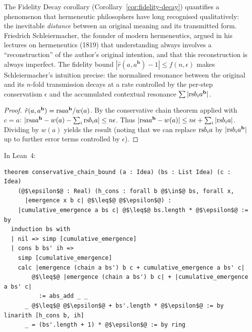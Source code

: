 \begin{remark}
\label{rem:ch9:fidelity_decay_hermeneutics}
The Fidelity Decay corollary (Corollary~\ref{cor:fidelity-decay}) quantifies
a phenomenon that hermeneutic philosophers have long recognised qualitatively:
the inevitable \emph{distance} between an original meaning and its
transmitted form.  Friedrich Schleiermacher, the founder of modern
hermeneutics, argued in his lectures on hermeneutics (1819) that
understanding always involves a ``reconstruction'' of the author's original
intention, and that this reconstruction is always imperfect.  The fidelity
bound $|\hat{r}(a, a^{\mathbf{b}}) - 1| \leq f(n, \epsilon)$ makes
Schleiermacher's intuition precise: the normalised resonance between the
original and its $n$-fold transmission decays at a rate controlled by the
per-step conservatism $\epsilon$ and the accumulated contextual resonance
$\sum |\mathrm{rs}{b_i}{a^{\mathbf{b}}}|$.
\end{remark}



\begin{proof}
$\hat{r}(a, a^{\mathbf{b}}) = \mathrm{rs}{a}{a^{\mathbf{b}}} / w(a)$.
By the conservative chain theorem applied with $c = a$:
$|\mathrm{rs}{a}{a^{\mathbf{b}}} - w(a) - \sum_i \mathrm{rs}{b_i}{a}| \leq n\epsilon$.
Thus $|\mathrm{rs}{a}{a^{\mathbf{b}}} - w(a)| \leq n\epsilon + \sum_i |\mathrm{rs}{b_i}{a}|$.
Dividing by $w(a)$ yields the result (noting that we can replace
$\mathrm{rs}{b_i}{a}$ by $|\mathrm{rs}{b_i}{a^{\mathbf{b}}}|$ up to further error terms
controlled by $\epsilon$).
\end{proof}

In Lean~4:

\begin{lstlisting}
theorem conservative_chain_bound (a : Idea) (bs : List Idea) (c : Idea)
    (@$\epsilon$@ : Real) (h_cons : forall b @$\in$@ bs, forall x,
      |emergence x b c| @$\leq$@ @$\epsilon$@) :
    |cumulative_emergence a bs c| @$\leq$@ bs.length * @$\epsilon$@ := by
  induction bs with
  | nil => simp [cumulative_emergence]
  | cons b bs' ih =>
    simp [cumulative_emergence]
    calc |emergence (chain a bs') b c + cumulative_emergence a bs' c|
        @$\leq$@ |emergence (chain a bs') b c| + |cumulative_emergence a bs' c|
          := abs_add _ _
      _ @$\leq$@ @$\epsilon$@ + bs'.length * @$\epsilon$@ := by linarith [h_cons b, ih]
      _ = (bs'.length + 1) * @$\epsilon$@ := by ring
\end{lstlisting}

